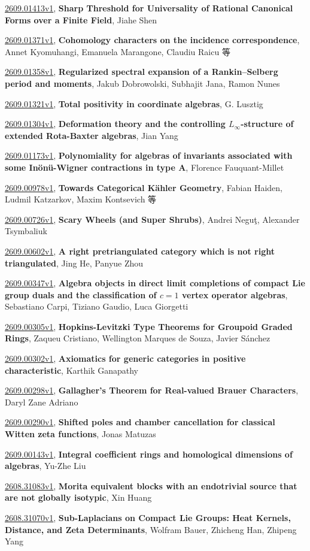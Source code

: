 \documentclass[9pt, a4paper]{article}
\theoremstyle{plain}
\theoremstyle{definition}
\theoremstyle{remark}
\newcommand{\arxiv}[3]{\href{https://arxiv.org/abs/#1}{#1}, \textbf{\textcolor{arxivblue}{#2}}, #3}
\begin{document}
\arxiv{2609.01413v1}{Sharp Threshold for Universality of Rational Canonical Forms over a Finite Field}{Jiahe Shen}

\arxiv{2609.01371v1}{Cohomology characters on the incidence correspondence}{Annet Kyomuhangi, Emanuela Marangone, Claudiu Raicu 等}

\arxiv{2609.01358v1}{Regularized spectral expansion of a Rankin--Selberg period and moments}{Jakub Dobrowolski, Subhajit Jana, Ramon Nunes}

\arxiv{2609.01321v1}{Total positivity in coordinate algebras}{G. Lusztig}

\arxiv{2609.01304v1}{Deformation theory and the controlling $L_{\infty}$-structure of extended Rota-Baxter algebras}{Jian Yang}

\arxiv{2609.01173v1}{Polynomiality for algebras of invariants associated with some Inönü-Wigner contractions in type A}{Florence Fauquant-Millet}

\arxiv{2609.00978v1}{Towards Categorical Kähler Geometry}{Fabian Haiden, Ludmil Katzarkov, Maxim Kontsevich 等}

\arxiv{2609.00726v1}{Scary Wheels (and Super Shrubs)}{Andrei Neguţ, Alexander Tsymbaliuk}

\arxiv{2609.00602v1}{A right pretriangulated category which is not right triangulated}{Jing He, Panyue Zhou}

\arxiv{2609.00347v1}{Algebra objects in direct limit completions of compact Lie group duals and the classification of $c=1$ vertex operator algebras}{Sebastiano Carpi, Tiziano Gaudio, Luca Giorgetti}

\arxiv{2609.00305v1}{Hopkins-Levitzki Type Theorems for Groupoid Graded Rings}{Zaqueu Cristiano, Wellington Marques de Souza, Javier Sánchez}

\arxiv{2609.00302v1}{Axiomatics for generic categories in positive characteristic}{Karthik Ganapathy}

\arxiv{2609.00298v1}{Gallagher's Theorem for Real-valued Brauer Characters}{Daryl Zane Adriano}

\arxiv{2609.00290v1}{Shifted poles and chamber cancellation for classical Witten zeta functions}{Jonas Matuzas}

\arxiv{2609.00143v1}{Integral coefficient rings and homological dimensions of algebras}{Yu-Zhe Liu}

\arxiv{2608.31083v1}{Morita equivalent blocks with an endotrivial source that are not globally isotypic}{Xin Huang}

\arxiv{2608.31070v1}{Sub-Laplacians on Compact Lie Groups: Heat Kernels, Distance, and Zeta Determinants}{Wolfram Bauer, Zhicheng Han, Zhipeng Yang}
\end{document}
